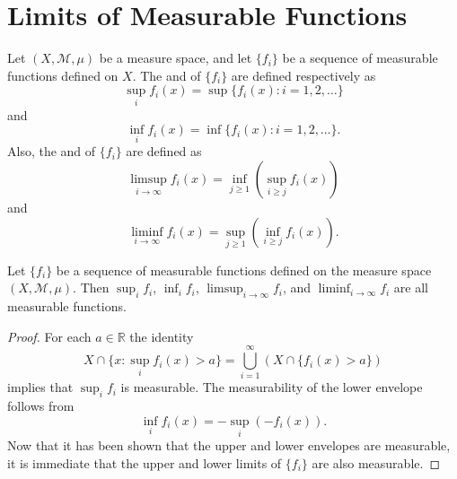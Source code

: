 \documentclass[../main.tex]{subfiles}
\begin{document}
\section{Limits of Measurable Functions}
\begin{definition}{}{}
Let $(X, \mathcal{M}, \mu)$ be a measure space, and let $\{f_i\}$ be a sequence of measurable functions defined on $X$. The  and  of $\{f_i\}$ are defined respectively as
\[
\sup_i f_i(x) = \sup\{f_i(x) : i = 1, 2, \dots\}
\]
and
\[
\inf_i f_i(x) = \inf\{f_i(x) : i = 1, 2, \dots\}.
\]
Also, the  and  of $\{f_i\}$ are defined as
\[
\limsup_{i \to \infty} f_i(x) = \inf_{j \ge 1} \left( \sup_{i \ge j} f_i(x) \right)
\]
and
\[
\liminf_{i \to \infty} f_i(x) = \sup_{j \ge 1} \left( \inf_{i \ge j} f_i(x) \right).
\]
\end{definition}
\begin{theorem}{}{}
Let $\{f_i\}$ be a sequence of measurable functions defined on the measure space $(X, \mathcal{M}, \mu)$. Then $\sup_i f_i$, $\inf_i f_i$, $\limsup_{i \to \infty} f_i$, and $\liminf_{i \to \infty} f_i$ are all measurable functions.
\end{theorem}

\begin{proof}
For each $a \in \mathbb{R}$ the identity
\[
X \cap \{x : \sup_i f_i(x) > a\} = \bigcup_{i=1}^{\infty} (X \cap \{f_i(x) > a\})
\]
implies that $\sup_i f_i$ is measurable. The measurability of the lower envelope follows from
\[
\inf_i f_i(x) = -\sup_i (-f_i(x)).
\]
Now that it has been shown that the upper and lower envelopes are measurable, it is immediate that the upper and lower limits of $\{f_i\}$ are also measurable.
\end{proof}
\end{document}
